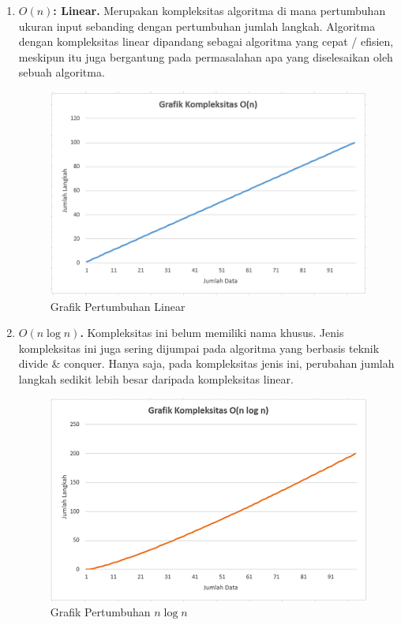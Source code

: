 \begin{enumerate}
    \FloatBarrier

    \item \textbf{$O (n)$: Linear.} Merupakan kompleksitas algoritma di mana pertumbuhan ukuran input sebanding dengan pertumbuhan jumlah langkah. Algoritma dengan kompleksitas linear dipandang sebagai algoritma yang cepat / efisien, meskipun itu juga bergantung pada permasalahan apa yang diselesaikan oleh sebuah algoritma.

    \begin{figure}
        \centering
        \includegraphics[width=\textwidth]{fig/LinearGrowth}
        \caption{Grafik Pertumbuhan Linear}
        \label{fig:LinearGrowth}
    \end{figure}

    \FloatBarrier

    \item \textbf{$O (n \log n)$.} Kompleksitas ini belum memiliki nama khusus. Jenis kompleksitas ini juga sering dijumpai pada algoritma yang berbasis teknik divide \& conquer. Hanya saja, pada kompleksitas jenis ini, perubahan jumlah langkah sedikit lebih besar daripada kompleksitas linear.

    \begin{figure}
        \centering
        \includegraphics[width=\textwidth]{fig/NLogNGrowth}
        \caption{Grafik Pertumbuhan $n \log n$}
        \label{fig:NLogNGrowth}
    \end{figure}


\end{enumerate}
